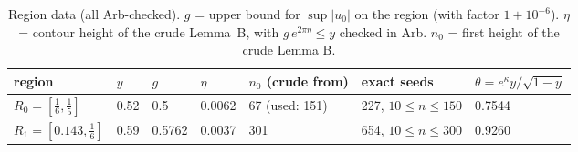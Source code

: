 \documentclass[11pt]{article}
\theoremstyle{remark}\newtheorem{remark}[theorem]{Remark}
\begin{document}
\begin{table}[h]\centering\small
\caption{Region data (all Arb-checked). $g$ = upper bound for $\sup|u_0|$ on the region (with factor $1+10^{-6}$). $\eta$ = contour height of the crude Lemma~B, with $g\,e^{2\pi\eta}\le y$ checked in Arb. $n_0$ = first height of the crude Lemma B.}\label{tab:reg}
\begin{tabular}{lllllll}\toprule
region & $y$ & $g$ & $\eta$ & $n_0$ (crude from) & exact seeds & $\theta=e^\kappa y/\sqrt{1-y}$\\\midrule
$R_0=[\frac16,\frac15]$ & 0.52 & 0.5 & 0.0062 & 67 (used: 151) & 227, $10\le n\le150$ & 0.7544\\
$R_1=[0.143,\frac16]$ & 0.59 & 0.5762 & 0.0037 & 301 & 654, $10\le n\le300$ & 0.9260\\\bottomrule
\end{tabular}\end{table}
\end{document}
